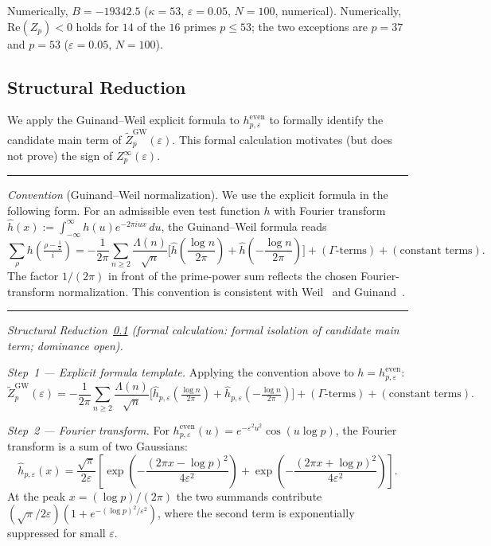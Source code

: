 \documentclass[11pt]{article}
\newenvironment{conventionbox}{%
  \medskip
  \noindent\rule{\linewidth}{0.4pt}\smallskip\par\noindent
}{%
  \par\smallskip\noindent\rule{\linewidth}{0.4pt}
  \medskip
}
\begin{document}
Numerically, $B=-19342.5$ ($\kappa=53$, $\varepsilon=0.05$,
$N=100$, numerical).
Numerically, $\mathrm{Re}(Z_p)<0$ holds for $14$ of the $16$ primes
$p\leq 53$; the two exceptions are $p=37$ and $p=53$
($\varepsilon=0.05$, $N=100$).

\subsection{Structural Reduction}
\label{ssec:reduction}

We apply the Guinand--Weil explicit formula to $h^{\mathrm{even}}_{p,\varepsilon}$
to formally identify the candidate main term of
$\widetilde Z_p^{\mathrm{GW}}(\varepsilon)$.
This formal calculation motivates (but does not prove)
the sign of $Z_p^\infty(\varepsilon)$.

\begin{conventionbox}
\emph{Convention} (Guinand--Weil normalization).
We use the explicit formula in the following form.
For an admissible even test function $h$ with Fourier transform
$\hat{h}(x) := \int_{-\infty}^\infty h(u)e^{-2\pi i ux}\,du$,
the Guinand--Weil formula reads
\[
\sum_\rho h\!\left(\tfrac{\rho-\frac12}{i}\right)
  = -\frac{1}{2\pi}\sum_{n\geq 2}\frac{\Lambda(n)}{\sqrt{n}}
    \bigl[\hat{h}({\textstyle\frac{\log n}{2\pi}})
          + \hat{h}({-\textstyle\frac{\log n}{2\pi}})\bigr]
  + (\Gamma\text{-terms}) + (\text{constant terms}).
\]
The factor $1/(2\pi)$ in front of the prime-power sum reflects
the chosen Fourier-transform normalization.
This convention is consistent with Weil~\cite{Weil} and
Guinand~\cite{Guinand}.
\end{conventionbox}

\textit{Structural Reduction~\ref{ssec:reduction}
(formal calculation: formal isolation of candidate main term; dominance open).}

\medskip

\textit{Step~1 --- Explicit formula template.}
Applying the convention above to $h=h^{\mathrm{even}}_{p,\varepsilon}$:
\[
\widetilde Z_p^{\mathrm{GW}}(\varepsilon)
  = -\frac{1}{2\pi}\sum_{n\geq 2}\frac{\Lambda(n)}{\sqrt{n}}
    \bigl[\hat{h}_{p,\varepsilon}({\textstyle\tfrac{\log n}{2\pi}})
    + \hat{h}_{p,\varepsilon}({-\textstyle\tfrac{\log n}{2\pi}})\bigr]
  + (\Gamma\text{-terms}) + (\text{constant terms}).
\]

\textit{Step~2 --- Fourier transform.}
For $h^{\mathrm{even}}_{p,\varepsilon}(u)=e^{-\varepsilon^2 u^2}\cos(u\log p)$,
the Fourier transform is a sum of two Gaussians:
\[
\widehat h_{p,\varepsilon}(x)
=\frac{\sqrt\pi}{2\varepsilon}
\left[
\exp\!\left(-\frac{(2\pi x-\log p)^2}{4\varepsilon^2}\right)
+
\exp\!\left(-\frac{(2\pi x+\log p)^2}{4\varepsilon^2}\right)
\right].
\]
At the peak $x = (\log p)/(2\pi)$ the two summands contribute
$(\sqrt\pi/2\varepsilon)(1 + e^{-(\log p)^2/\varepsilon^2})$,
where the second term is exponentially suppressed for small $\varepsilon$.
\end{document}
